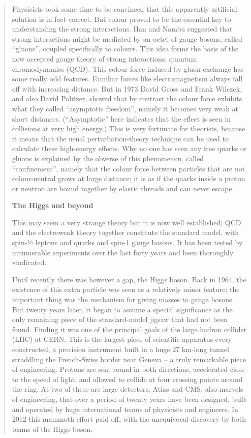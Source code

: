 \begin{quote}
Physicists took some time to be convinced that this apparently artificial solution is in fact correct. But colour proved to be the essential key to understanding the strong interactions. Han and Nambu suggested that strong interactions might be mediated by an octet of gauge bosons, called “gluons”, coupled specifically to colours. This idea forms the basis of the now accepted gauge theory of strong interactions, quantum chromodynamics (QCD). This colour force induced by gluon exchange has some really odd features. Familiar forces like electromagnetism always fall off with increasing distance. But in 1973 David Gross and Frank Wilczek, and also David Politzer, showed that by contrast the colour force exhibits what they called “asymptotic freedom”, namely it becomes very weak at short distances. (“Asymptotic” here indicates that the effect is seen in collisions at very high energy.) This is very fortunate for theorists, because it means that the usual perturbation-theory technique can be used to calculate these high-energy effects. Why no one has seen any free quarks or gluons is explained by the obverse of this phenomenon, called “confinement”, namely that the colour force between particles that are not colour-neutral grows at large distance; it is as if the quarks inside a proton or neutron are bound together by elastic threads and can never escape.

\textbf{The Higgs and beyond}

This may seem a very strange theory but it is now well established; QCD and the electroweak theory together constitute the standard model, with spin-½ leptons and quarks and spin-1 gauge bosons. It has been tested by innumerable experiments over the last forty years and been thoroughly vindicated.

Until recently there was however a gap, the Higgs boson. Back in 1964, the existence of this extra particle was seen as a relatively minor feature; the important thing was the mechanism for giving masses to gauge bosons. But twenty years later, it began to assume a special significance as the only remaining piece of the standard-model jigsaw that had not been found. Finding it was one of the principal goals of the large hadron collider (LHC) at CERN. This is the largest piece of scientific apparatus every constructed, a precision instrument built in a huge 27 km-long tunnel straddling the French-Swiss border near Geneva -- a truly remarkable piece of engineering. Protons are sent round in both directions, accelerated close to the speed of light, and allowed to collide at four crossing points around the ring. At two of these are large detectors, Atlas and CMS, also marvels of engineering, that over a period of twenty years have been designed, built and operated by huge international teams of physicists and engineers. In 2012 this mammoth effort paid off, with the unequivocal discovery by both teams of the Higgs boson.


\end{quote}
